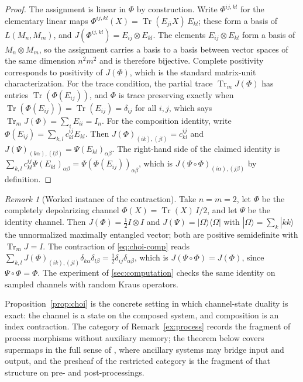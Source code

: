 \documentclass[11pt,letterpaper]{article}
\DeclareMathOperator{\Tr}{Tr}
\theoremstyle{definition}
\theoremstyle{remark}
\newtheorem{remark}[theorem]{Remark}
\begin{document}
\begin{proof}
The assignment is linear in $\Phi$ by construction. Write $\Phi^{ij,kl}$ for the elementary linear maps $\Phi^{ij,kl}(X) = \Tr(E_{ji} X)\, E_{kl}$; these form a basis of $L(M_n, M_m)$, and $J(\Phi^{ij,kl}) = E_{ij} \otimes E_{kl}$. The elements $E_{ij} \otimes E_{kl}$ form a basis of $M_n \otimes M_m$, so the assignment carries a basis to a basis between vector spaces of the same dimension $n^2 m^2$ and is therefore bijective. Complete positivity corresponds to positivity of $J(\Phi)$, which is the standard matrix-unit characterization. For the trace condition, the partial trace $\Tr_m J(\Phi)$ has entries $\Tr(\Phi(E_{ij}))$, and $\Phi$ is trace preserving exactly when $\Tr(\Phi(E_{ij})) = \Tr(E_{ij}) = \delta_{ij}$ for all $i, j$, which says $\Tr_m J(\Phi) = \sum_i E_{ii} = I_n$. For the composition identity, write $\Phi(E_{ij}) = \sum_{k,l} c^{ij}_{kl} E_{kl}$. Then $J(\Phi)_{(ik),(jl)} = c^{ij}_{kl}$ and $J(\Psi)_{(k\alpha),(l\beta)} = \Psi(E_{kl})_{\alpha\beta}$. The right-hand side of the claimed identity is $\sum_{k,l} c^{ij}_{kl} \Psi(E_{kl})_{\alpha\beta} = \Psi(\Phi(E_{ij}))_{\alpha\beta}$, which is $J(\Psi \circ \Phi)_{(i\alpha),(j\beta)}$ by definition.
\end{proof}

\begin{remark}[Worked instance of the contraction]
\label{rem:worked}
Take $n = m = 2$, let $\Phi$ be the completely depolarizing channel $\Phi(X) = \Tr(X)\, I/2$, and let $\Psi$ be the identity channel. Then $J(\Phi) = \tfrac{1}{2} I \otimes I$ and $J(\Psi) = |\Omega\rangle\langle\Omega|$ with $|\Omega\rangle = \sum_{k} |kk\rangle$ the unnormalized maximally entangled vector; both are positive semidefinite with $\Tr_m J = I$. The contraction of \eqref{eq:choi-comp} reads $\sum_{k,l} J(\Phi)_{(ik),(jl)} \delta_{k\alpha} \delta_{l\beta} = \tfrac{1}{2} \delta_{ij} \delta_{\alpha\beta}$, which is $J(\Psi \circ \Phi) = J(\Phi)$, since $\Psi \circ \Phi = \Phi$. The experiment of \cref{sec:computation} checks the same identity on sampled channels with random Kraus operators.
\end{remark}

Proposition~\ref{prop:choi} is the concrete setting in which channel-state duality is exact: the channel is a state on the composed system, and composition is an index contraction. The category of Remark~\ref{ex:process} records the fragment of process morphisms without auxiliary memory; the theorem below covers supermaps in the full sense of \cite{whh, hw}, where ancillary systems may bridge input and output, and the presheaf of the restricted category is the fragment of that structure on pre- and post-processings.
\end{document}
